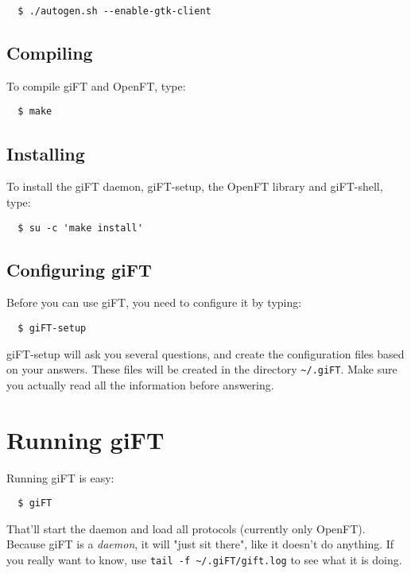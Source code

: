\documentclass[10pt]{article}
\begin{document}
\begin{verbatim}
  $ ./autogen.sh --enable-gtk-client
\end{verbatim}

\subsection{Compiling}

To compile giFT and OpenFT, type:

\begin{verbatim}
  $ make
\end{verbatim}

\subsection{Installing}

To install the giFT daemon, giFT-setup, the OpenFT library and
giFT-shell, type:

\begin{verbatim}
  $ su -c 'make install'
\end{verbatim}

\subsection{Configuring giFT}

Before you can use giFT, you need to configure it by typing:

\begin{verbatim}
  $ giFT-setup
\end{verbatim}

giFT-setup will ask you several questions, and create the
configuration files based on your answers.  These files will be
created in the directory \texttt{\~{}/.giFT}. Make sure you
actually read all the information before answering.

\section{Running giFT}
Running giFT is easy:

\begin{verbatim}
  $ giFT
\end{verbatim}

That'll start the daemon and load all protocols (currently only
OpenFT). Because giFT is a \emph{daemon}, it will "just sit there",
like it doesn't do anything. If you really want to know, use
\verb|tail -f ~/.giFT/gift.log| to see what it is doing.
\end{document}
